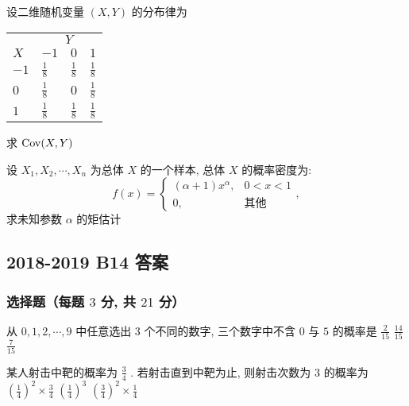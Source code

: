 \begin{ti}[$8$ 分]
	设二维随机变量 $(X,Y)$ 的分布律为
	\begin{center}
		\begin{tabularx}{0.8\textwidth}{ZZZZ}
			\hline
			 & \\
			$X$ & $-1$ & $0$ & $1$\\
			\hline
			$-1$ & $\frac{1}{8}$ & $\frac{1}{8}$ & $\frac{1}{8}$\\
			$0$ & $\frac{1}{8}$ & $0$ & $\frac{1}{8}$\\
			$1$ & $\frac{1}{8}$ & $\frac{1}{8}$ & $\frac{1}{8}$\\
			\hline
		\end{tabularx}
	\end{center}
	求 $\operatorname{Cov}(X,Y)$
\end{ti}

\begin{ti}[$10$ 分]
	设 $X_1,X_2,\cdots,X_n$ 为总体 $X$ 的一个样本, 总体 $X$ 的概率密度为:
	\begin{equation*}
		f(x)=
		\begin{cases}
		(\alpha+1)x^\alpha, & 0<x<1\\
		0, & \text{其他}
		\end{cases},
	\end{equation*}
	求未知参数 $\alpha$ 的矩估计
\end{ti}

\subsection{2018-2019 B14 答案}
\subsubsection{选择题（每题 $3$ 分, 共 $21$ 分）}
\begin{ti}
	从 $0,1,2,\cdots,9$ 中任意选出 $3$ 个不同的数字, 三个数字中不含 $0$ 与 $5$ 的概率是 \kuoD{}
	{$\frac{2}{15}$}
	{$\frac{14}{15}$}
	{$\frac{7}{15}$}
\end{ti}

\begin{ti}
	某人射击中靶的概率为 $\frac{3}{4}$ . 若射击直到中靶为止, 则射击次数为 $3$ 的概率为 \kuoB{}
	{$\left(\frac{1}{4}\right)^2\times\frac{3}{4}$}
	{$\left(\frac{1}{4}\right)^3$}
	{$\left(\frac{3}{4}\right)^2\times\frac{1}{4}$}
\end{ti}

